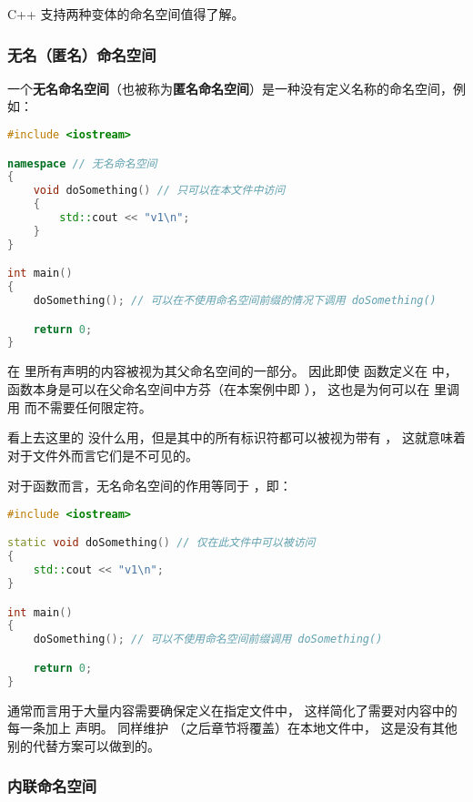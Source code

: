 \documentclass[../../LearnCpp.tex]{subfiles}
\begin{document}

C++ 支持两种变体的命名空间值得了解。

\subsubsection*{无名（匿名）命名空间}

一个\textbf{无名命名空间}（也被称为\textbf{匿名命名空间}）是一种没有定义名称的命名空间，例如：

\begin{lstlisting}[language=C++]
#include <iostream>

namespace // 无名命名空间
{
    void doSomething() // 只可以在本文件中访问
    {
        std::cout << "v1\n";
    }
}

int main()
{
    doSomething(); // 可以在不使用命名空间前缀的情况下调用 doSomething()

    return 0;
}
\end{lstlisting}

在  里所有声明的内容被视为其父命名空间的一部分。
因此即使  函数定义在  中，
函数本身是可以在父命名空间中方芬（在本案例中即 ），
这也是为何可以在  里调用  而不需要任何限定符。

看上去这里的  没什么用，但是其中的所有标识符都可以被视为带有 ，
这就意味着对于文件外而言它们是不可见的。

对于函数而言，无名命名空间的作用等同于 ，即：

\begin{lstlisting}[language=C++]
#include <iostream>

static void doSomething() // 仅在此文件中可以被访问
{
    std::cout << "v1\n";
}

int main()
{
    doSomething(); // 可以不使用命名空间前缀调用 doSomething()

    return 0;
}
\end{lstlisting}

 通常而言用于大量内容需要确保定义在指定文件中，
这样简化了需要对内容中的每一条加上  声明。
 同样维护 （之后章节将覆盖）在本地文件中，
这是没有其他别的代替方案可以做到的。

\subsubsection*{内联命名空间}
\end{document}
